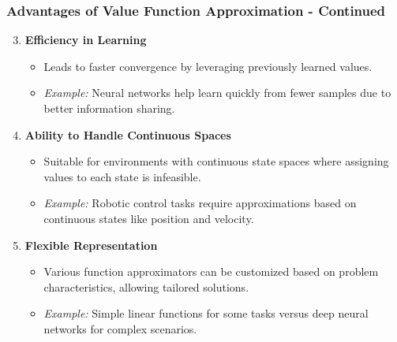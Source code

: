 \documentclass[aspectratio=169]{beamer}
\begin{document}
\begin{frame}[fragile]
    \frametitle{Advantages of Value Function Approximation - Continued}
    \begin{enumerate}
        \setcounter{enumi}{2} %
        \item \textbf{Efficiency in Learning}
        \begin{itemize}
            \item Leads to faster convergence by leveraging previously learned values.
            \item \textit{Example:} Neural networks help learn quickly from fewer samples due to better information sharing.
        \end{itemize}

        \item \textbf{Ability to Handle Continuous Spaces}
        \begin{itemize}
            \item Suitable for environments with continuous state spaces where assigning values to each state is infeasible.
            \item \textit{Example:} Robotic control tasks require approximations based on continuous states like position and velocity.
        \end{itemize}

        \item \textbf{Flexible Representation}
        \begin{itemize}
            \item Various function approximators can be customized based on problem characteristics, allowing tailored solutions.
            \item \textit{Example:} Simple linear functions for some tasks versus deep neural networks for complex scenarios.
        \end{itemize}
    \end{enumerate}
\end{frame}
\end{document}

